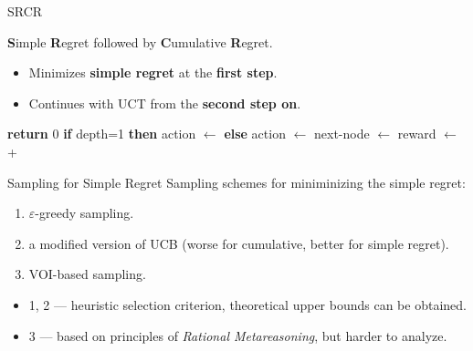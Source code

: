 \documentclass{beamer}
\begin{document}
\begin{frame}{SRCR}

{\bf S}imple {\bf R}egret followed by {\bf C}umulative {\bf R}egret.
\begin{itemize}
\item Minimizes {\bf simple regret} at the {\bf first step}.
\item Continues with UCT from the {\bf second step on}.
\end{itemize}
\vspace{1em}
\begin{algorithmic}[1]
    \State \textbf{return} 0
  \Else
    \State \textbf{if} depth=1 \textbf{then} action $\gets$  \label{alg:srcr-first-action}   
    \State \textbf{else} action $\gets$  \label{alg:srcr-next-action}
    \State next-node $\gets$ 
    \State reward $\gets$ 
     \State \hspace{4em} + 
    \State {}
  \EndIf
\EndProcedure
\end{algorithmic}
\end{frame}

\begin{frame}{Sampling for Simple Regret}
Sampling schemes for miniminizing the simple regret:
\begin{enumerate}
\item $\varepsilon$-greedy sampling.
\item a modified version of UCB (worse for cumulative, better for
  simple regret).
\item<+-> VOI-based sampling.
\end{enumerate}

\begin{itemize}
\item<+-> 1, 2 --- heuristic selection criterion, theoretical upper bounds
  can be obtained.
\item<+-> 3 --- based on principles of {\it Rational Metareasoning},
  but harder to analyze.
\end{itemize}

\end{frame}
\end{document}

